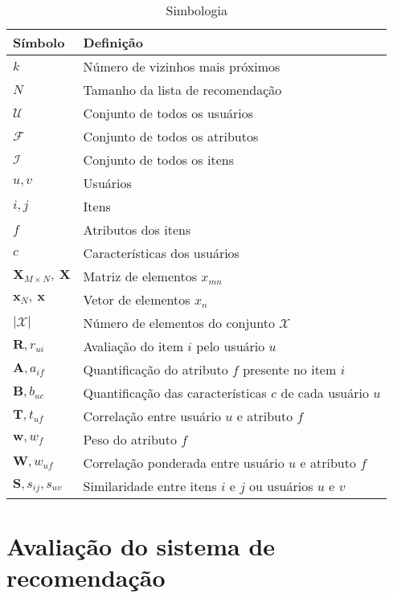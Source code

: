 \begin{table}[hp]
\begin{center}
    \caption{Simbologia}
    \label{tab:simbologia}
    \begin{tabular}{ | l | l | }
    \hline
    \textbf{Símbolo} & \textbf{Definição} \\ \hline
    $k$ & Número de vizinhos mais próximos \\ \hline
    $N$ & Tamanho da lista de recomendação \\ \hline
    $\mathcal{U}$ & Conjunto de todos os usuários \\ \hline
    $\mathcal{F}$ & Conjunto  de todos os atributos \\ \hline
    $\mathcal{I}$ & Conjunto de todos os itens \\ \hline
    $u, v$ & Usuários \\ \hline
    $i, j$ & Itens \\ \hline
    $f$ & Atributos dos itens \\ \hline
    $c $ & Características dos usuários \\ \hline
    $\mathbf{X}_{M \times N},~\mathbf{X}$ & Matriz de elementos $x_{mn}$ \\ \hline
    $\mathbf{x}_{N},~\mathbf{x}$ & Vetor de elementos $x_{n}$ \\ \hline
    $|\mathcal{X}|$ & Número de elementos do conjunto $\mathcal{X}$ \\ \hline
    $\mathbf{R}, r_{ui}$ & Avaliação do item $i$ pelo usuário $u$\\ \hline
    $\mathbf{A}, a_{if}$ & Quantificação do atributo $f$ presente no item $i$ \\ \hline
    $\mathbf{B}, b_{uc}$ & Quantificação das características $c$ de cada usuário $u$ \\ \hline    
    $\mathbf{T}, t_{uf}$ & Correlação entre usuário $u$ e atributo $f$ \\ \hline
    $\mathbf{w}, w_{f}$ & Peso do atributo $f$ \\ \hline
    $\mathbf{W}, w_{uf}$ & Correlação ponderada entre usuário $u$ e atributo $f$ \\ \hline
    $\mathbf{S}, s_{ij}, s_{uv}$ & Similaridade entre itens $i$ e $j$ ou usuários $u$ e $v$\\ \hline
    \end{tabular}
\end{center}
\end{table}


\section{Avaliação do sistema de recomendação} %
\label{sec:avalia_o_do_sistema_de_recomenda_o}

